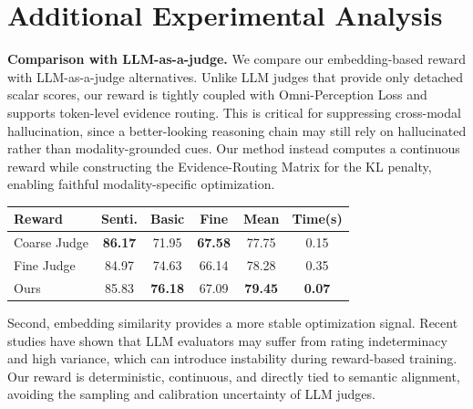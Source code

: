 \documentclass{article}
\theoremstyle{plain}
\theoremstyle{definition}
\theoremstyle{remark}
\begin{document}
\section{Additional Experimental Analysis}
\label{app:additional_analysis}

\noindent
\begin{minipage}[t]{0.56\textwidth}
\textbf{Comparison with LLM-as-a-judge.}
We compare our embedding-based reward with LLM-as-a-judge alternatives.
Unlike LLM judges that provide only detached scalar scores, our reward is tightly coupled with Omni-Perception Loss and supports token-level evidence routing.
This is critical for suppressing cross-modal hallucination, since a better-looking reasoning chain may still rely on hallucinated rather than modality-grounded cues.
Our method instead computes a continuous reward while constructing the Evidence-Routing Matrix for the KL penalty, enabling faithful modality-specific optimization.
\end{minipage}
\hfill
\begin{minipage}[t]{0.40\textwidth}
\vspace{-2mm}
\centering
\fontsize{8}{10}\selectfont
\renewcommand{\arraystretch}{1.25}
\setlength{\tabcolsep}{4.0pt}

\label{tab:llm_judge_comparison}

\begin{tabular}{l c c c c c}
    \toprule
    \textbf{Reward} & \textbf{Senti.} & \textbf{Basic} & \textbf{Fine} & \textbf{Mean} & \textbf{Time(s)} \\
    \midrule
    Coarse Judge 
    & \textbf{86.17} & 71.95 & \textbf{67.58} & 77.75 & 0.15 \\
    Fine Judge 
    & 84.97 & 74.63 & 66.14 & 78.28 & 0.35 \\
    \rowcolor{tabhighlight}
    Ours 
    & 85.83 & \textbf{76.18} & 67.09 & \textbf{79.45} & \textbf{0.07} \\
    \bottomrule
\end{tabular}
\end{minipage}




Second, embedding similarity provides a more stable optimization signal.
Recent studies have shown that LLM evaluators may suffer from rating indeterminacy and high variance, which can introduce instability during reward-based training.
Our reward is deterministic, continuous, and directly tied to semantic alignment, avoiding the sampling and calibration uncertainty of LLM judges.
\end{document}

